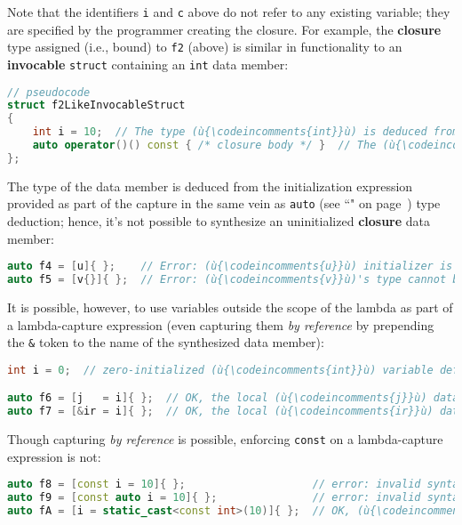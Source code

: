 \noindent Note that the identifiers \texttt{i} and \texttt{c} above do not refer
to any existing variable; they are specified by the programmer creating
the closure. For example, the \textbf{closure} type assigned (i.e.,
bound) to \texttt{f2} (above) is similar in functionality to an
\textbf{invocable} \texttt{struct} containing an \texttt{int} data
member:

\begin{lstlisting}[language=C++]
// pseudocode
struct f2LikeInvocableStruct
{
    int i = 10;  // The type (ù{\codeincomments{int}}ù) is deduced from the initialization expression.
    auto operator()() const { /* closure body */ }  // The (ù{\codeincomments{struct}}ù) is invocable.
};
\end{lstlisting}

\noindent The type of the data member is deduced from the initialization
expression provided as part of the capture in the same vein as
\texttt{auto} (see ``" on page~\pageref{auto-feature}) type deduction; hence, it's not possible to
synthesize an uninitialized \textbf{closure} data member:

\begin{lstlisting}[language=C++]
auto f4 = [u]{ };    // Error: (ù{\codeincomments{u}}ù) initializer is missing for lambda capture.
auto f5 = [v{}]{ };  // Error: (ù{\codeincomments{v}}ù)'s type cannot be deduced.
\end{lstlisting}

\noindent It is possible, however, to use variables outside the scope of the
lambda as part of a lambda-capture expression (even capturing them \textit{by
reference} by prepending the \texttt{\&} token to the name of the
synthesized data member):

\begin{lstlisting}[language=C++]
int i = 0;  // zero-initialized (ù{\codeincomments{int}}ù) variable defined in the enclosing scope

auto f6 = [j   = i]{ };  // OK, the local (ù{\codeincomments{j}}ù) data member is a copy of (ù{\codeincomments{i}}ù).
auto f7 = [&ir = i]{ };  // OK, the local (ù{\codeincomments{ir}}ù) data member is an alias to (ù{\codeincomments{i}}ù).
\end{lstlisting}

\noindent Though capturing \textit{by reference} is possible, enforcing \texttt{const} on a lambda-capture expression is not:

\begin{lstlisting}[language=C++]
auto f8 = [const i = 10]{ };                    // error: invalid syntax
auto f9 = [const auto i = 10]{ };               // error: invalid syntax
auto fA = [i = static_cast<const int>(10)]{ };  // OK, (ù{\codeincomments{const}}ù) is ignored.
\end{lstlisting}

